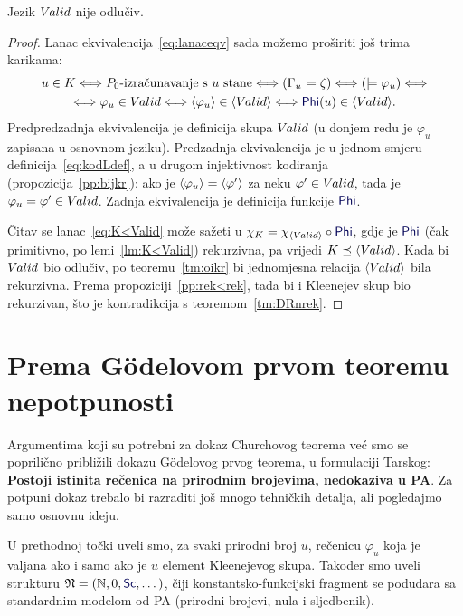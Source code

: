 \begin{propozicija}
Jezik $V\mspace{-1.5mu}alid$ nije odlučiv\!.
\end{propozicija}
\begin{proof}
Lanac ekvivalencija~\eqref{eq:lanaceqv} sada možemo proširiti još trima karikama:
\begin{multline}\label{eq:K<Valid}
    u\in K
    \Longleftrightarrow
    \text{$P_0$-izračunavanje s $u$ stane}
    \Longleftrightarrow
    (\Gamma_u\models\zeta)
    \Longleftrightarrow{}
    (\models\varphi_u)
    \Longleftrightarrow\\
    \Longleftrightarrow
    \varphi_u\in\Valid
    \Longleftrightarrow
    \kr{\varphi_u}\in\kr{\Valid}
    \Longleftrightarrow
    \f{Phi}(u)\in\kr{\Valid}
    \text.
\end{multline}
Predpredzadnja ekvivalencija je definicija skupa $V\mspace{-1.5mu}alid$ (u donjem redu je $\varphi_u$ zapisana u osnovnom jeziku). Predzadnja ekvivalencija je u jednom smjeru definicija~\eqref{eq:kodLdef}, a u drugom injektivnost kodiranja (propozicija~\ref{pp:bijkr}): ako je $\langle\varphi_u\rangle=\langle\varphi'\rangle$ za neku $\varphi'\in V\mspace{-1.5mu}alid$, tada je $\varphi_u=\varphi'\in V\mspace{-1.5mu}alid$. Zadnja ekvivalencija je definicija funkcije $\f{Phi}$.

	Čitav se lanac~\eqref{eq:K<Valid} može sažeti u $\chi_{K}=\chi_{\kr{\Valid}}\circ\f{Phi}$, gdje je $\f{Phi}$ (čak primitivno, po lemi~\ref{lm:K<Valid}) rekurzivna, pa vrijedi $K\preceq\langle V\mspace{-1.5mu}alid\rangle$.
Kada bi $V\mspace{-1.5mu}alid$ bio odlučiv\!, po teoremu~\ref{tm:oikr} bi jednomjesna relacija $\langle V\mspace{-1.5mu}alid\rangle$ bila rekurzivna. Prema propoziciji~\ref{pp:rek<rek}, tada bi i Kleenejev skup bio rekurzivan, što je kontradikcija s teoremom~\ref{tm:DRnrek}.
\end{proof}

\section{Prema Gödelovom prvom teoremu nepotpunosti}

Argumentima koji su potrebni za dokaz Churchovog teorema već smo se poprilično približili dokazu Gödelovog prvog teorema, u formulaciji Tarskog: \textbf{Postoji istinita rečenica na prirodnim brojevima, nedokaziva u PA\@}. Za potpuni dokaz trebalo bi razraditi još mnogo tehničkih detalja, ali pogledajmo samo osnovnu ideju.

U prethodnoj točki uveli smo, za svaki prirodni broj $u$, rečenicu $\varphi_u$ koja je valjana ako i samo ako je $u$ element Kleenejevog skupa. Također smo uveli strukturu $\mathfrak N=(\N,0,\f{Sc},\dotsc)$, čiji konstantsko-funkcijski fragment se podudara sa standardnim modelom od PA (prirodni brojevi, nula i sljedbenik).

